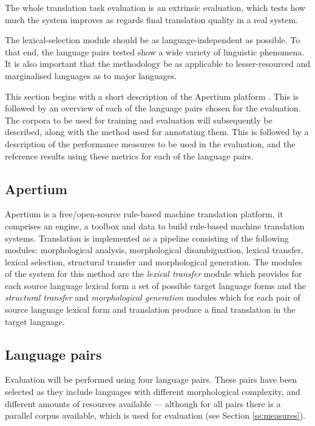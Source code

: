 \documentclass[11pt]{article}
\begin{document}
The
whole translation task evaluation is an extrinsic evaluation, which
tests how much the system improves as regards final translation
quality in a real system.

The lexical-selection module should be as language-independent as
possible. To that end, the language pairs tested show a wide
variety of linguistic phenomena. It is also important that the
methodology be as applicable to lesser-resourced and marginalised
languages as to major languages.

This section begins with a short description of the Apertium 
platform \citep{forcada2011apertium}. This is followed by 
an overview of each of the language
pairs chosen for the evaluation. The corpora to be used for training
and evaluation will subsequently be described, along with the method
used for annotating them. This is followed by a description of the
performance measures to be used in the evaluation, and the reference
results using these metrics for each of the language pairs.

\subsection{Apertium}
\label{sec:apertium}

Apertium is a free/open-source rule-based machine translation platform, 
it comprises an engine, a toolbox and data to build rule-based machine
translation systems. Translation is implemented as a pipeline consisting
of the following modules: morphological analysis, morphological disambiguation,
lexical transfer, lexical selection, structural transfer and morphological
generation. The modules of the system for this method are the \emph{lexical transfer}
module which provides for each source language lexical form a set of possible
target language forms and the \emph{structural transfer} and \emph{morphological generation}
modules which for each pair of source language lexical form and translation 
produce a final translation in the target language. 

\subsection{Language pairs}
\label{sec:eval-systems}

Evaluation will be performed using four language pairs. These pairs
have been selected as they include languages with different
morphological complexity, and different amounts of resources available
--- although for all pairs there is a parallel corpus available, which
is used for evaluation (see Section \ref{ss:measures}). 
\end{document}
